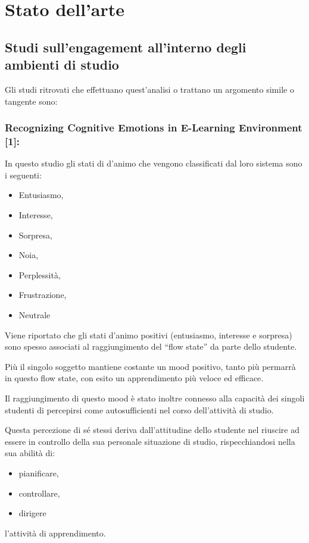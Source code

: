 \chapter{Stato dell'arte}

\section{Studi sull’engagement all’interno degli ambienti di studio}
Gli studi ritrovati che effettuano quest’analisi o trattano un argomento simile o tangente sono:
\subsection{Recognizing Cognitive Emotions in E-Learning Environment [1]:}
In questo studio gli stati di d’animo che vengono classificati dal loro sistema sono i seguenti:
\begin{itemize}
    \item Entusiasmo,
    \item Interesse,
    \item Sorpresa,
    \item Noia,
    \item Perplessità,
    \item Frustrazione,
    \item Neutrale
\end{itemize}

Viene riportato che gli stati d’animo positivi (entusiasmo, interesse e sorpresa) sono spesso associati al raggiungimento del “flow state” da parte dello studente.

Più il singolo soggetto mantiene costante un mood positivo, tanto più permarrà in questo flow state, con esito un apprendimento più veloce ed efficace.

Il raggiungimento di questo mood è stato inoltre connesso alla capacità dei singoli studenti di percepirsi come autosufficienti nel corso dell’attività di studio.

Questa percezione di sé stessi deriva dall’attitudine dello studente nel riuscire ad essere in controllo della sua personale situazione di studio, rispecchiandosi nella sua abilità di:
\begin{itemize}
    \item pianificare,
    \item controllare,
    \item dirigere
\end{itemize}
l’attività di apprendimento.

